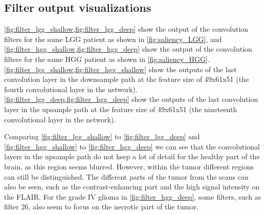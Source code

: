 \begin{subappendices}
\section{Filter output visualizations}\label{app:filter_vis}

\cref{fig:filter_lgg_shallow,fig:filter_lgg_deep} show the output of the convolution filters for the same \gls{LGG} patient as shown in \cref{fig:saliency_LGG}, and \cref{fig:filter_hgg_shallow,fig:filter_hgg_deep}  show the output of the convolution filters for the same \gls{HGG} patient as shown in \cref{fig:saliency_HGG}.
\cref{fig:filter_lgg_shallow,fig:filter_hgg_shallow} show the outputs of the last convolution layer in the downsample path at the feature size of 49x61x51 (the fourth convolutional layer in the network).
\cref{fig:filter_lgg_deep,fig:filter_hgg_deep} show the outputs of the last convolution layer in the upsample path at the feature size of 49x61x51 (the nineteenth convolutional layer in the network).

Comparing \cref{fig:filter_lgg_shallow} to \cref{fig:filter_lgg_deep} and \cref{fig:filter_hgg_shallow} to \cref{fig:filter_hgg_deep} we can see that the convolutional layers in the upsample path do not keep a lot of detail for the healthy part of the brain, as this region seems blurred.
However, within the tumor different regions can still be distinguished.
The different parts of the tumor from the scans can also be seen, such as the contrast-enhancing part and the high signal intensity on the \gls{FLAIR}.
For the grade IV glioma in \cref{fig:filter_hgg_deep}, some filters, such as filter 26, also seem to focus on the necrotic part of the tumor.


\end{subappendices}
